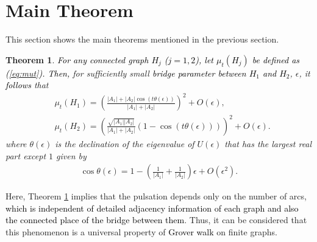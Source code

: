 \documentclass[12pt]{article}
\newtheorem{theorem}{Theorem}
\newtheorem{corollary}{Corollary}
\numberwithin{lemma}{section}
\numberwithin{proposition}{section}
\numberwithin{remark}{section}
\numberwithin{definition}{section}
\newcommand{\red}{\textcolor{black}}
\begin{document}

\section{Main Theorem}
This section shows the main theorems mentioned in the previous section.
\begin{theorem}
\label{thm: prob}
\red{For any connected graph $H_j$ ($j=1,2$), let $\mu_t(H_j)$ be defined as (\ref{eq:mut}). }
\red{Then,} for sufficiently small \red{bridge parameter between $H_1$ and $H_2$}, $\epsilon$, it \red{follows} that
    \begin{align*}
        &\mu_{t}(H_1)= \left( \frac{|A_1|+|A_{2}| \cos{(t\theta(\epsilon))}}{|A_1|+|A_2|}\right)^2 +O(\epsilon), \\
        &\mu_{t}(H_2)= \left( \frac{\sqrt{|A_1||A_2|}}{|A_1|+|A_2|}(1-\cos(t\theta(\epsilon)))\right)^2 +O(\epsilon).
    \end{align*}
    where $\theta(\epsilon)$ is the declination of the eigenvalue of  $U(\epsilon)$ that has the largest real part except $1$ given by
    \begin{align*}
        \cos \theta(\epsilon)=1-\left(\frac{1}{|A_1|}+\frac{1}{|A_2|}\right)\epsilon+O(\epsilon^2).
    \end{align*}
\end{theorem}
Here, 
Theorem \ref{thm: prob} implies that the pulsation depends only on the number of arcs, \red{which is independent of detailed adjacency information of each graph and also the connected place of the bridge between them}. Thus, it can be considered that this phenomenon is a universal property of \red{Grover walk} on finite graphs.
    
\end{document}
